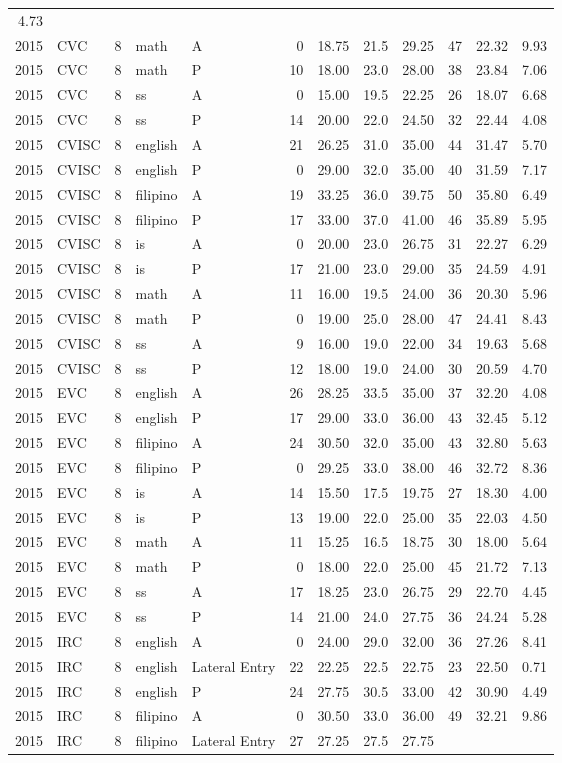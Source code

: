 \documentclass[]{article}
\begin{document}
\begin{longtable}[]{@{}rlrllrrrrrrr@{}}
4.73\tabularnewline
2015 & CVC & 8 & math & A & 0 & 18.75 & 21.5 & 29.25 & 47 & 22.32 &
9.93\tabularnewline
2015 & CVC & 8 & math & P & 10 & 18.00 & 23.0 & 28.00 & 38 & 23.84 &
7.06\tabularnewline
2015 & CVC & 8 & ss & A & 0 & 15.00 & 19.5 & 22.25 & 26 & 18.07 &
6.68\tabularnewline
2015 & CVC & 8 & ss & P & 14 & 20.00 & 22.0 & 24.50 & 32 & 22.44 &
4.08\tabularnewline
2015 & CVISC & 8 & english & A & 21 & 26.25 & 31.0 & 35.00 & 44 & 31.47
& 5.70\tabularnewline
2015 & CVISC & 8 & english & P & 0 & 29.00 & 32.0 & 35.00 & 40 & 31.59 &
7.17\tabularnewline
2015 & CVISC & 8 & filipino & A & 19 & 33.25 & 36.0 & 39.75 & 50 & 35.80
& 6.49\tabularnewline
2015 & CVISC & 8 & filipino & P & 17 & 33.00 & 37.0 & 41.00 & 46 & 35.89
& 5.95\tabularnewline
2015 & CVISC & 8 & is & A & 0 & 20.00 & 23.0 & 26.75 & 31 & 22.27 &
6.29\tabularnewline
2015 & CVISC & 8 & is & P & 17 & 21.00 & 23.0 & 29.00 & 35 & 24.59 &
4.91\tabularnewline
2015 & CVISC & 8 & math & A & 11 & 16.00 & 19.5 & 24.00 & 36 & 20.30 &
5.96\tabularnewline
2015 & CVISC & 8 & math & P & 0 & 19.00 & 25.0 & 28.00 & 47 & 24.41 &
8.43\tabularnewline
2015 & CVISC & 8 & ss & A & 9 & 16.00 & 19.0 & 22.00 & 34 & 19.63 &
5.68\tabularnewline
2015 & CVISC & 8 & ss & P & 12 & 18.00 & 19.0 & 24.00 & 30 & 20.59 &
4.70\tabularnewline
2015 & EVC & 8 & english & A & 26 & 28.25 & 33.5 & 35.00 & 37 & 32.20 &
4.08\tabularnewline
2015 & EVC & 8 & english & P & 17 & 29.00 & 33.0 & 36.00 & 43 & 32.45 &
5.12\tabularnewline
2015 & EVC & 8 & filipino & A & 24 & 30.50 & 32.0 & 35.00 & 43 & 32.80 &
5.63\tabularnewline
2015 & EVC & 8 & filipino & P & 0 & 29.25 & 33.0 & 38.00 & 46 & 32.72 &
8.36\tabularnewline
2015 & EVC & 8 & is & A & 14 & 15.50 & 17.5 & 19.75 & 27 & 18.30 &
4.00\tabularnewline
2015 & EVC & 8 & is & P & 13 & 19.00 & 22.0 & 25.00 & 35 & 22.03 &
4.50\tabularnewline
2015 & EVC & 8 & math & A & 11 & 15.25 & 16.5 & 18.75 & 30 & 18.00 &
5.64\tabularnewline
2015 & EVC & 8 & math & P & 0 & 18.00 & 22.0 & 25.00 & 45 & 21.72 &
7.13\tabularnewline
2015 & EVC & 8 & ss & A & 17 & 18.25 & 23.0 & 26.75 & 29 & 22.70 &
4.45\tabularnewline
2015 & EVC & 8 & ss & P & 14 & 21.00 & 24.0 & 27.75 & 36 & 24.24 &
5.28\tabularnewline
2015 & IRC & 8 & english & A & 0 & 24.00 & 29.0 & 32.00 & 36 & 27.26 &
8.41\tabularnewline
2015 & IRC & 8 & english & Lateral Entry & 22 & 22.25 & 22.5 & 22.75 &
23 & 22.50 & 0.71\tabularnewline
2015 & IRC & 8 & english & P & 24 & 27.75 & 30.5 & 33.00 & 42 & 30.90 &
4.49\tabularnewline
2015 & IRC & 8 & filipino & A & 0 & 30.50 & 33.0 & 36.00 & 49 & 32.21 &
9.86\tabularnewline
2015 & IRC & 8 & filipino & Lateral Entry & 27 & 27.25 & 27.5 & 27.75 &

\end{longtable}
\end{document}
